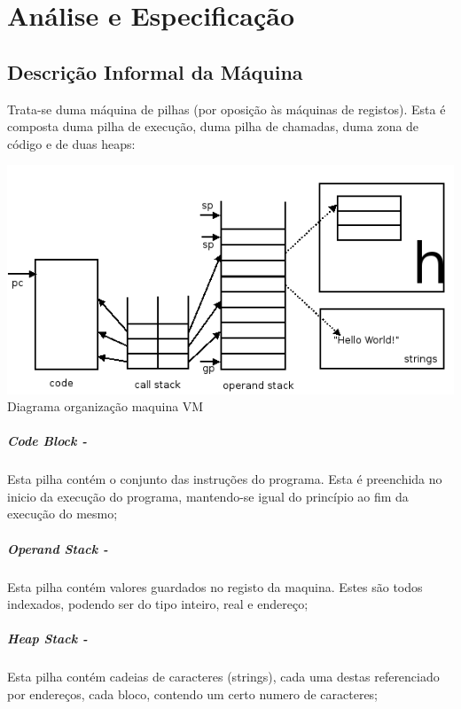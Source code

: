 \documentclass{report}
\begin{document}
\chapter{Análise e Especificação} \label{ae}
\section{Descrição Informal da Máquina}

\quad Trata-se duma máquina de pilhas (por oposição às máquinas de registos). Esta é composta duma pilha de execução, duma pilha de chamadas,
duma zona de código e de duas heaps:

\begin{center}
\includegraphics{stacks.png} \\
\caption { Diagrama organização maquina VM }
\end{center}

\paragraph{\quad Code Block -}
Esta pilha contém o conjunto das instruções do programa. Esta é preenchida no inicio da execução do programa, mantendo-se igual
do princípio ao fim da execução do mesmo;
\paragraph{\quad Operand Stack -}
Esta pilha contém valores guardados no registo da maquina. Estes são todos indexados, podendo ser do tipo inteiro, real e endereço;
\paragraph{\quad Heap Stack -}
Esta pilha contém cadeias de caracteres (strings), cada uma destas referenciado por endereços, cada bloco,
contendo um certo numero de caracteres;
\end{document}
